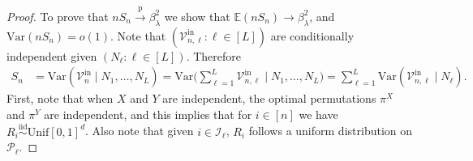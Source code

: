 \documentclass[11pt]{article}
\newcommand{\E}{\mathbb{E}}
\newcommand{\var}{\mathrm{Var}}
\newcommand{\pto}{\xrightarrow{\,\mathrm{p}\,} }
\newcommand{\iid}{\stackrel{\mathrm{iid}}\sim}
\begin{document}
\begin{proof}
To prove that $nS_n\pto \beta_\lambda^2$ we show that $\E(nS_n)\to\beta_\lambda^2$, and $\var(nS_n) = o(1)$. Note that $(\mathcal{V}_{n,\ell}^{\mathrm{in}}:\ell\in[L])$ are conditionally independent given $(N_\ell:\ell\in[L])$. Therefore
    \begin{align*}
        S_n &= \var(\mathcal{V}_n^{\mathrm{in}}\mid N_1, \ldots, N_L) = \var\Big(\sum_{\ell = 1}^L \mathcal{V}_{n, \ell}^{\mathrm{in}}\mid N_1, \ldots, N_L\Big) = \sum_{\ell = 1}^L \var(\mathcal{V}_{n, \ell}^{\mathrm{in}}\mid N_\ell).
    \end{align*}
    First, note that when $X$ and $Y$ are independent, the optimal permutations $\pi^X$ and $\pi^Y$ are independent, and this implies that for $i \in [n]$ we have $R_i \iid \mathrm{Unif}[0,1]^d$. Also note that given $i\in\mathcal{I}_\ell$, $R_i$ follows a uniform distribution on $\mathcal{P}_\ell$. 


\end{proof}
\end{document}
